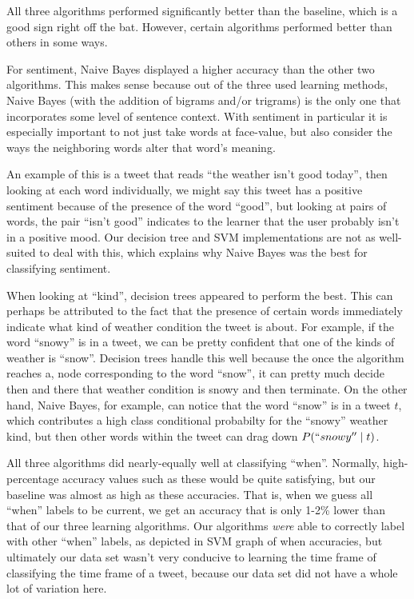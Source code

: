	All three algorithms performed significantly better than the baseline, which is a good sign right off the bat. However, certain algorithms performed better than others in some ways.

	 For sentiment, Naive Bayes displayed a higher accuracy than the other two algorithms. This makes sense because out of the three used learning methods, Naive Bayes (with the addition of bigrams and/or trigrams) is the only one that incorporates some level of sentence context. With sentiment in particular it is especially important to not just take words at face-value, but also consider the ways the neighboring words alter that word's meaning. 

	An example of this is a tweet that reads ``the weather isn't good today'', then looking at each word individually, we might say this tweet has a positive sentiment because of the presence of the word ``good'', but looking at pairs of words, the pair ``isn't good'' indicates to the learner that the user probably isn't in a positive mood. Our decision tree and SVM implementations are not as well-suited to deal with this, which explains why Naive Bayes was the best for classifying sentiment. 

	When looking at ``kind'', decision trees appeared to perform the best. This can perhaps be attributed to the fact that the presence of certain words immediately indicate what kind of weather condition the tweet is about. For example, if the word ``snowy'' is in a tweet, we can be pretty confident that one of the kinds of weather is ``snow''. Decision trees handle this well because the once the algorithm reaches a, node corresponding to the word ``snow'', it can pretty much decide then and there that weather condition is snowy and then terminate. On the other hand, Naive Bayes, for example, can notice that the word ``snow'' is in a tweet $t$, which contributes a high class conditional probabilty for the ``snowy'' weather kind, but then other words within the tweet can drag down $P(``snowy'' \mid t)$.
	
	All three algorithms did nearly-equally well at classifying ``when''. Normally, high-percentage accuracy values such as these would be quite satisfying, but our baseline was almost as high as these accuracies. That is, when we guess all ``when'' labels to be current, we get an accuracy that is only 1-2\% lower than that of our three learning algorithms. Our algorithms \emph{were} able to correctly label with other ``when'' labels, as depicted in SVM graph of when accuracies, but ultimately our data set wasn't very conducive to learning the time frame of classifying the time frame of a tweet, because our data set did not have a whole lot of variation here. 

